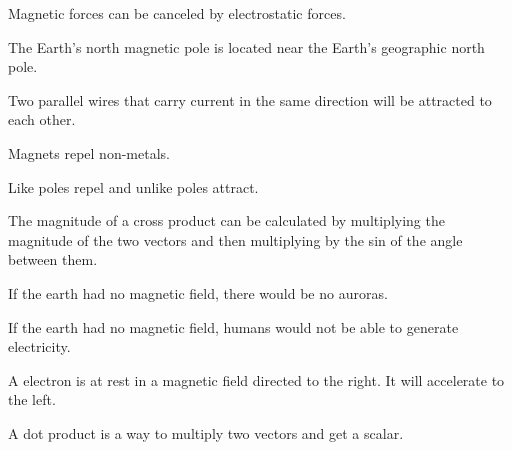 \documentclass[10pt]{examdesign}
\begin{document}
\begin{truefalse}[title={True or False},
	rearrange=no]
\begin{question}
	 Magnetic forces can be canceled by electrostatic forces.
\end{question}

\begin{question}
	  The Earth's north magnetic pole is located near the Earth's geographic north pole.
\end{question}


\begin{question}
	 Two parallel wires that carry current in the same direction will be attracted to each other.
\end{question}

\begin{question}
	  Magnets repel non-metals.
\end{question}

\begin{question}
	  Like poles repel and unlike poles attract.
\end{question}




    
    \begin{question}
    	  The magnitude of a cross product can be calculated by multiplying the magnitude of the two vectors and then multiplying by the sin of the angle between them. 
    	
    \end{question}
    
   
\begin{question}
	  If the earth had no magnetic field, there would be no auroras.
\end{question}


\begin{question}
	  If the earth had no magnetic field, humans would not be able to generate electricity.
\end{question}

\begin{question}
	  A electron is at rest in a magnetic field directed to the right.  It will accelerate to the left. 
\end{question}

\begin{question}
	 A dot product is a way to multiply two vectors and get a scalar. \pagebreak
	\end{question}


\end{truefalse}
\end{document}
